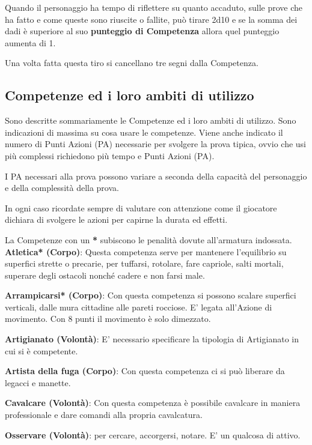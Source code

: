 \documentclass[12pt,a4paper,twoside,openany]{book}
\begin{document}
\begin{multicols}{2}
Quando il personaggio ha tempo di riflettere su quanto accaduto, sulle prove che ha fatto e come queste sono riuscite o fallite, può tirare 2d10 e se la somma dei dadi è superiore al suo \textbf{punteggio di Competenza} allora quel punteggio aumenta di 1.

Una volta fatta questa tiro si cancellano tre segni dalla Competenza.	

\subsection{Competenze ed i loro ambiti di utilizzo}\label{competenzeambitidiutilizzo}

Sono descritte sommariamente le Competenze ed i loro ambiti di utilizzo. Sono indicazioni di massima su cosa usare le competenze. Viene anche indicato il numero di Punti Azioni (PA) necessarie per svolgere la prova tipica, ovvio che usi più complessi richiedono più tempo e Punti Azioni (PA).

I PA necessari alla prova possono variare a seconda della capacità del personaggio e della complessità della prova.

In ogni caso ricordate sempre di valutare con attenzione come il giocatore dichiara di svolgere le azioni per capirne la durata ed effetti. 

La Competenze con un \textbf{*} subiscono le penalità dovute all'armatura indossata.\\

\textbf{Atletica* (Corpo)}: Questa competenza serve per mantenere l'equilibrio su superfici strette o precarie, per tuffarsi, rotolare, fare capriole, salti mortali, superare degli ostacoli nonché cadere e non farsi male. 

\textbf{Arrampicarsi* (Corpo)}: Con questa competenza si possono scalare superfici verticali, dalle mura cittadine alle pareti rocciose. E' legata all'Azione di movimento. Con 8 punti il movimento è solo dimezzato.

\textbf{Artigianato (Volontà)}: E' necessario specificare la tipologia di Artigianato in cui si è competente.

\textbf{Artista della fuga (Corpo)}: Con questa competenza ci si può liberare da legacci e manette.

\textbf{Cavalcare (Volontà)}: Con questa competenza è possibile cavalcare in maniera professionale e dare comandi alla propria cavalcatura. 

\textbf{Osservare (Volontà)}: per cercare, accorgersi, notare. E' un qualcosa di attivo.


\end{multicols}
\end{document}
